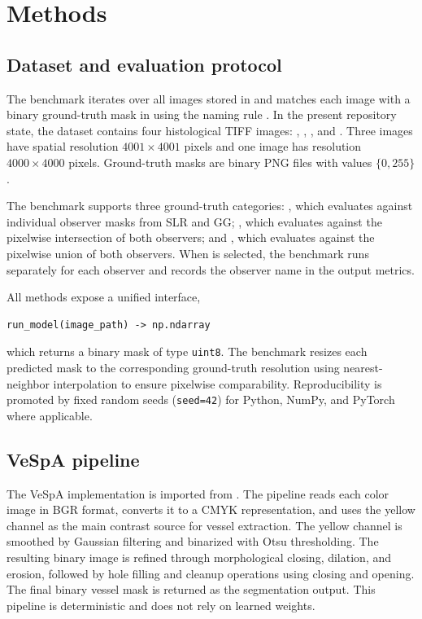 \section{Methods}
\subsection{Dataset and evaluation protocol}
The benchmark iterates over all images stored in  and matches each image with a binary ground-truth mask in  using the naming rule . In the present repository state, the dataset contains four histological TIFF images: , , , and . Three images have spatial resolution \(4001 \times 4001\) pixels and one image has resolution \(4000 \times 4000\) pixels. Ground-truth masks are binary PNG files with values \(\{0,255\}\).

The benchmark supports three ground-truth categories: , which evaluates against individual observer masks from SLR and GG; , which evaluates against the pixelwise intersection of both observers; and , which evaluates against the pixelwise union of both observers. When  is selected, the benchmark runs separately for each observer and records the observer name in the output metrics.

All methods expose a unified interface,
\begin{verbatim}
run_model(image_path) -> np.ndarray
\end{verbatim}
which returns a binary mask of type \texttt{uint8}. The benchmark resizes each predicted mask to the corresponding ground-truth resolution using nearest-neighbor interpolation to ensure pixelwise comparability. Reproducibility is promoted by fixed random seeds (\texttt{seed=42}) for Python, NumPy, and PyTorch where applicable.

\subsection{VeSpA pipeline}
The VeSpA implementation is imported from . The pipeline reads each color image in BGR format, converts it to a CMYK representation, and uses the yellow channel as the main contrast source for vessel extraction. The yellow channel is smoothed by Gaussian filtering and binarized with Otsu thresholding. The resulting binary image is refined through morphological closing, dilation, and erosion, followed by hole filling and cleanup operations using closing and opening. The final binary vessel mask is returned as the segmentation output. This pipeline is deterministic and does not rely on learned weights.

